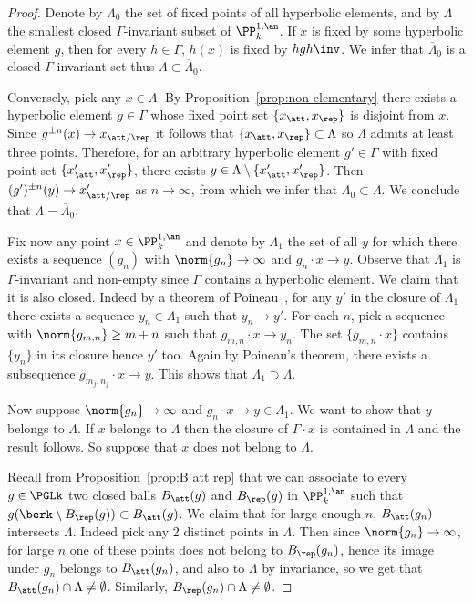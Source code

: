 \begin{proof}
Denote by $\Lambda_0$ the set of fixed points of all hyperbolic elements, and by $\Lambda$ the smallest closed $\Gamma$-invariant subset of $\PP^{1,\an}_k$. If $x$ is fixed by some hyperbolic element $g$, then for every $h\in \Gamma$, $h(x)$ is fixed by $hgh\inv$. We infer that $\overline{\Lambda}_0$ is a closed $\Gamma$-invariant set thus $\Lambda\subset \overline{\Lambda}_0$.

Conversely, pick any $x\in \Lambda$. By Proposition~\ref{prop:non elementary} there exists a hyperbolic element $g\in \Gamma$ whose fixed point set $\{ x_\att, x_\rep\}$ is disjoint from $x$. Since $g^{\pm n}(x) \to x_{\att/\rep} $ it follows that $\{x_\att, x_\rep\} \subset \Lambda$ so $\Lambda$ admits at least three points. Therefore, for an arbitrary hyperbolic element $g'\in\Gamma$ with fixed point set $\{ x'_\att, x'_\rep\}$, there exists $y\in \Lambda\setminus \{ x'_\att, x'_\rep\}$. Then $(g')^{\pm n}(y) \to x'_{\att/\rep}$ as $n\to\infty$, from which we infer that $\Lambda_0 \subset \Lambda$. We conclude that $\Lambda = \overline{\Lambda}_0 $.


Fix now any point $x\in \PP^{1,\an}_k$ and denote by $\Lambda_1$ the set of all $y$ for which there exists a sequence $(g_n)$ with $\norm{g_n}\to\infty$ and $g_n\cdot x \to y$. Observe that $\Lambda_1$ is $\Gamma$-invariant and non-empty since $\Gamma$ contains a hyperbolic element. We claim that it is also closed. Indeed by a theorem of Poineau~\cite[Thm.~5.3]{poineau}, for any $y'$ in the closure of $\Lambda_1$ there exists a sequence $y_n \in \Lambda_1$ such that $y_n \to y'$. For each $n$, pick a sequence with $\norm{g_{m,n}}
\ge m+n$ such that $g_{m,n}\cdot x \to y_n$. The set $\{ g_{m,n}\cdot x\}$ contains $\{y_n\}$ in its closure hence $y'$ too. Again by Poineau's theorem, there exists a subsequence $g_{m_j,n_j}\cdot x \to y$. This shows that $\Lambda_1\supset\Lambda$.


Now suppose $\norm{g_n}\to\infty$ and $g_n\cdot x \to y\in\Lambda_1$. We want to show that $y$ belongs to $\Lambda$. If $x$ belongs to $\Lambda$ then the closure of $\Gamma\cdot x$ is contained in $\Lambda$ and the result follows. So suppose that $x$ does not belong to $\Lambda$.

Recall from Proposition~\ref{prop:B att rep} that we can associate to every $g\in \PGLk$ two closed balls $B_{\att}(g)$ and $B_{\rep}(g)$ in $\PP^{1,\an}_k$ such that $g (\berk\setminus B_{\rep}(g)) \subset B_{\att}(g)$. We claim that for large enough $n$, $B_{\att}(g_n)$ intersects $\Lambda$. Indeed pick any 2 distinct points in $\Lambda$. Then since $\norm{g_n}\to \infty$, for large $n$ one of these points does not belong to $B_{\rep}(g_n)$, hence its image under $g_n$ belongs to $B_{\att}(g_n)$, and also to $\Lambda$ by invariance, so we get that $B_{\att}(g_n)\cap \Lambda\neq \emptyset$. Similarly, $B_{\rep}(g_n)\cap \Lambda\neq \emptyset$.


\end{proof}
